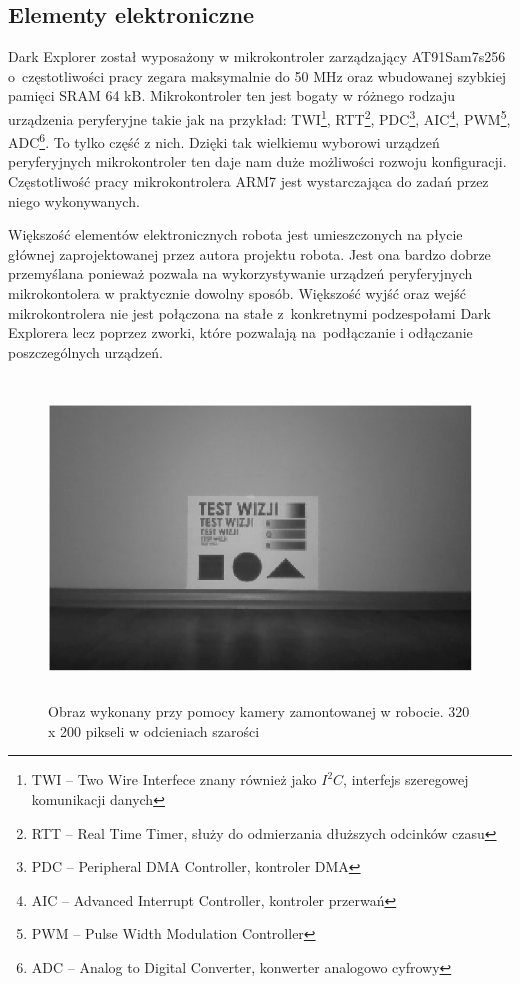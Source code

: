 \subsection{Elementy elektroniczne}
Dark Explorer został wyposażony w mikrokontroler zarządzający AT91Sam7s256 o~częstotliwości pracy zegara maksymalnie do 50 MHz oraz wbudowanej szybkiej
pamięci SRAM 64 kB. Mikrokontroler ten jest bogaty w różnego rodzaju urządzenia
peryferyjne takie jak na przykład: TWI\footnote{TWI -- Two Wire Interfece znany
również jako $I^{2}C$, interfejs szeregowej komunikacji danych}, RTT\footnote{RTT
-- Real Time Timer, służy do odmierzania dłuższych odcinków czasu},
PDC\footnote{PDC -- Peripheral DMA Controller, kontroler DMA}, AIC\footnote{AIC
-- Advanced Interrupt Controller, kontroler przerwań}, PWM\footnote{PWM -- Pulse
Width Modulation Controller}, ADC\footnote{ADC -- Analog to Digital Converter,
konwerter analogowo cyfrowy}. To tylko część z nich. Dzięki tak wielkiemu
wyborowi urządzeń peryferyjnych mikrokontroler ten daje nam duże możliwości
rozwoju konfiguracji. Częstotliwość pracy mikrokontrolera ARM7 jest wystarczająca
do zadań przez niego wykonywanych.

Większość elementów elektronicznych robota jest umieszczonych na płycie głównej
zaprojektowanej przez autora projektu robota. Jest ona bardzo dobrze przemyślana
ponieważ pozwala na wykorzystywanie urządzeń peryferyjnych mikrokontolera w
praktycznie dowolny sposób. Większość wyjść oraz wejść mikrokontrolera nie jest
połączona na stałe z~konkretnymi podzespołami Dark Explorera lecz poprzez zworki,
które pozwalają na~podłączanie i odłączanie poszczególnych urządzeń.

\begin{figure}[!ht]
 \centering
 \includegraphics[height=85mm]{../images/ch02/320x200B&W.jpg}
 \caption{Obraz wykonany przy pomocy kamery zamontowanej w robocie. 320 x 200 pikseli w odcieniach szarości \cite{KmakMScThesis2009}}
 \label{fig:320x200BW}
\end{figure}

